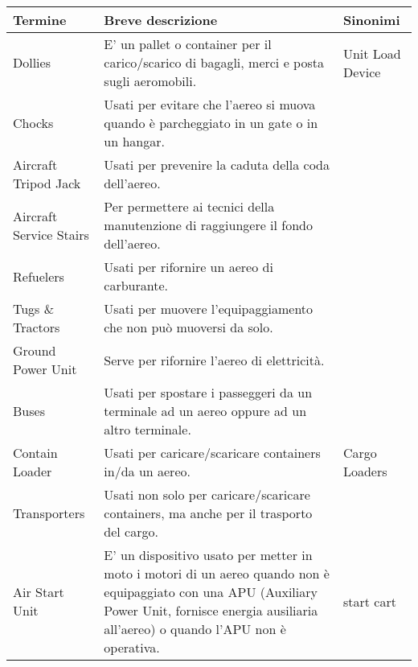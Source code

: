 \begin{table}[htp]
	\centering
	{\small %
		\begin{tabular}{p{}p{}p{}}
			\textbf{Termine} & \textbf{Breve descrizione} & \textbf{Sinonimi} \\
			\hline			
			\textsf{\small Dollies} & \textsf{\small E' un pallet o container per il carico/scarico di bagagli, merci e posta sugli aeromobili.} & \textsf{\small Unit Load Device} \\
			\hline
			\textsf{\small Chocks} & \textsf{\small Usati per evitare che l'aereo si muova quando è parcheggiato in un gate o in un hangar.} & \textsf{\small } \\
			\hline
			\textsf{\small Aircraft Tripod Jack} & \textsf{\small Usati per prevenire la caduta della coda dell'aereo.} & \textsf{\small } \\
			\hline
			\textsf{\small Aircraft Service Stairs} & \textsf{\small Per permettere ai tecnici della manutenzione di raggiungere il fondo dell'aereo.} & \textsf{\small } \\
			\hline
			\textsf{\small Refuelers} & \textsf{\small Usati per rifornire un aereo di carburante.} & \textsf{\small } \\
			\hline
			\textsf{\small Tugs \& Tractors} & \textsf{\small Usati per muovere l'equipaggiamento che non può muoversi da solo.} & \textsf{\small } \\
			\hline
			\textsf{\small Ground Power Unit} & \textsf{\small Serve per rifornire l'aereo di elettricità.} & \textsf{\small } \\
			\hline
			\textsf{\small Buses} & \textsf{\small Usati per spostare i passeggeri da un terminale ad un aereo oppure ad un altro terminale.} & \textsf{\small } \\
			\hline
			\textsf{\small Contain Loader} & \textsf{\small Usati per caricare/scaricare containers in/da un aereo.} & \textsf{\small Cargo Loaders} \\
			\hline
			\textsf{\small Transporters} & \textsf{\small Usati non solo per caricare/scaricare containers, ma anche per il trasporto del cargo.} & \textsf{\small } \\
			\hline
			\textsf{\small Air Start Unit} & \textsf{\small E' un dispositivo usato per metter in moto i motori di un aereo quando non è equipaggiato con una APU (Auxiliary Power Unit, fornisce energia ausiliaria all'aereo) o quando l'APU non è operativa.} & \textsf{\small start cart} \\

\end{tabular}}
\end{table}
